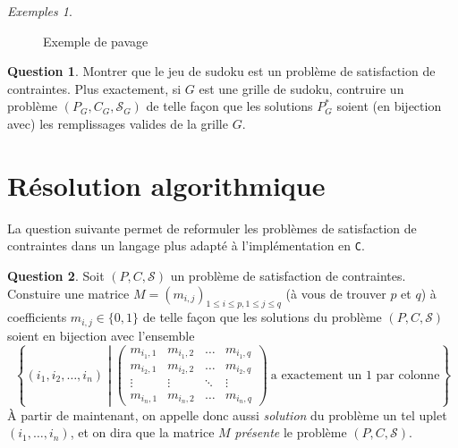 \documentclass[french,a4paper]{article}
\theoremstyle{definition}
\newtheorem{question}{Question}
\theoremstyle{remark}
\newtheorem*{examples}{Exemples}
\begin{document}
\begin{examples}
\begin{enumerate}[label=(\arabic*)]
\begin{figure}[h!]
      \centering %
      \caption{Exemple de pavage}%
      \label{fig:tiling}%
    \end{figure}
  \end{enumerate}
\end{examples}

\begin{question}
  Montrer que le jeu de sudoku est un problème de satisfaction de
  contraintes. Plus exactement, si $G$ est une grille de sudoku,
  contruire un problème $(P_G,C_G,\mathcal S_G)$ de telle façon que
  les solutions $P_G^\ast$ soient (en bijection avec) les remplissages
  valides de la grille $G$.
\end{question}

\section{Résolution algorithmique}

La question suivante permet de reformuler les problèmes de
satisfaction de contraintes dans un langage plus adapté à
l'implémentation en {\tt C}.

\begin{question}
  Soit $(P,C,\mathcal S)$ un problème de satisfaction de
  contraintes. Constuire une matrice
  $M = (m_{i,j})_{1\leq i \leq p,1\leq j\leq q}$ (à vous de trouver
  $p$ et $q$) à coefficients $m_{i,j} \in \{0,1\}$ de telle façon que
  les solutions du problème $(P,C,\mathcal S)$ soient en bijection
  avec l'ensemble
  \begin{displaymath}
    \left\{
      (i_1,i_2,\dots,i_n) \middle| 
      \begin{pmatrix}
        m_{i_1,1} & m_{i_1,2} & \dots & m_{i_1,q} \\
        m_{i_2,1} & m_{i_2,2} & \dots & m_{i_2,q} \\
        \vdots & \vdots & \ddots & \vdots \\
        m_{i_n,1} & m_{i_n,2} & \dots & m_{i_n,q}
      \end{pmatrix} \
      \text{a exactement un $1$ par colonne}
    \right\}
  \end{displaymath}
  \`A partir de maintenant, on appelle donc aussi {\em solution} du
  problème un tel uplet $(i_1,\dots,i_n)$, et on dira que la matrice
  $M$ {\em présente} le problème $(P,C,\mathcal S)$.
\end{question}
\end{document}
